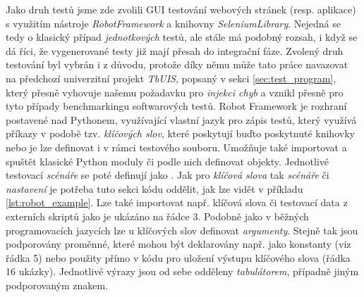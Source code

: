 \documentclass[czech, ma, kiv, he, iso690alph, pdf, viewonly]{fasthesis}
\begin{document}
        Jako druh testů jsme zde zvolili GUI testování webových stránek (resp. aplikace) s využitím nástroje \textit{RobotFramework} a knihovny \textit{SeleniumLibrary}. Nejedná se tedy o klasický případ \textit{jednotkových} testů, ale stále má podobný rozsah, i když se dá říci, že vygenerované testy již mají přesah do integrační fáze. Zvolený druh testování byl vybrán i z důvodu, protože díky němu může tato práce navazovat na předchozí univerzitní projekt \textit{TbUIS}, popsaný v sekci \ref{sec:test_program}, který přesně vyhovuje našemu požadavku pro \emph{injekci chyb} a vznikl přesně pro tyto případy \gls{benchmark}ingu softwarových testů. Robot Framework je rozhraní postavené nad Pythonem, využívající vlastní jazyk pro zápis testů, který využívá příkazy v podobě tzv. \textit{klíčových slov}, které poskytují buďto poskytnuté knihovky nebo je lze definovat i v rámci testového souboru. Umožňuje také importovat a spuštět klasické Python moduly či podle nich definovat objekty. Jednotlivé testovací \textit{scénáře} se poté definují jako . Jak pro \textit{klíčová slova} tak \textit{scénáře} či \textit{nastavení} je potřeba tuto sekci kódu oddělit, jak lze vidět v příkladu \ref{lst:robot_example}. Lze také importovat např. klíčová slova či testovací data z externích skriptů jako je ukázáno na řádce 3. Podobně jako v běžných programovacích jazycích lze u klíčových slov definovat \emph{argumenty}. Stejně tak jsou podporovány proměnné, které mohou být deklarovány např. jako konstanty (viz řádka 5) nebo použity přímo v kódu pro uložení výstupu klíčového slova (řádka 16 ukázky). Jednotlivé výrazy jsou od sebe odděleny \textit{tabulátorem}, případně jiným podporovaným znakem.
        
\end{document}
